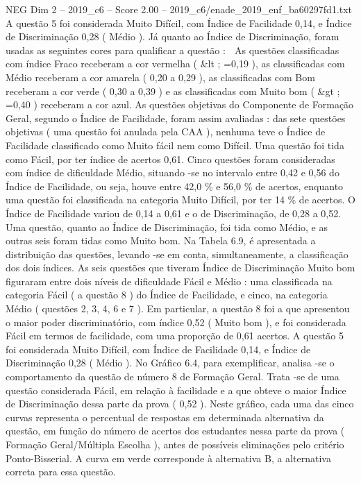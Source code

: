 \begin{textsample}{NEG Dim 2 – 2019\_c6 – Score 2.00 – 2019\_c6/enade\_2019\_enf\_ba60297fd1.txt}
A questão 5 foi considerada Muito Difícil, com Índice de Facilidade 0,14, e Índice de Discriminação 0,28 ( Médio ).
Já quanto ao Índice de Discriminação, foram usadas as seguintes cores para qualificar a questão :  As questões classificadas com índice Fraco receberam a cor vermelha ( \&lt ; =0,19 ), as classificadas com Médio receberam a cor amarela ( 0,20 a 0,29 ), as classificadas com Bom receberam a cor verde ( 0,30 a 0,39 ) e as classificadas com Muito bom ( \&gt ; =0,40 ) receberam a cor azul.
As questões objetivas do Componente de Formação Geral, segundo o Índice de Facilidade, foram assim avaliadas : das sete questões objetivas ( uma questão foi anulada pela CAA ), nenhuma teve o Índice de Facilidade classificado como Muito fácil nem como Difícil.
Uma questão foi tida como Fácil, por ter índice de acertos 0,61.
Cinco questões foram consideradas com índice de dificuldade Médio, situando -se no intervalo entre 0,42 e 0,56 do Índice de Facilidade, ou seja, houve entre 42,0 \% e 56,0 \% de acertos, enquanto uma questão foi classificada na categoria Muito Difícil, por ter 14 \% de acertos.
O Índice de Facilidade variou de 0,14 a 0,61 e o de Discriminação, de 0,28 a 0,52.
Uma questão, quanto ao Índice de Discriminação, foi tida como Médio, e as outras seis foram tidas como Muito bom.
Na Tabela 6.9, é apresentada a distribuição das questões, levando -se em conta, simultaneamente, a classificação dos dois índices.
As seis questões que tiveram Índice de Discriminação Muito bom figuraram entre dois níveis de dificuldade Fácil e Médio : uma classificada na categoria Fácil ( a questão 8 ) do Índice de Facilidade, e cinco, na categoria Médio ( questões 2, 3, 4, 6 e 7 ).
Em particular, a questão 8 foi a que apresentou o maior poder discriminatório, com índice 0,52 ( Muito bom ), e foi considerada Fácil em termos de facilidade, com uma proporção de 0,61 acertos.
A questão 5 foi considerada Muito Difícil, com Índice de Facilidade 0,14, e Índice de Discriminação 0,28 ( Médio ).
No Gráfico 6.4, para exemplificar, analisa -se o comportamento da questão de número 8 de Formação Geral.
Trata -se de uma questão considerada Fácil, em relação à facilidade e a que obteve o maior Índice de Discriminação dessa parte da prova ( 0,52 ).
Neste gráfico, cada uma das cinco curvas representa o percentual de respostas em determinada alternativa da questão, em função do número de acertos dos estudantes nessa parte da prova ( Formação Geral/Múltipla Escolha ), antes de possíveis eliminações pelo critério Ponto-Bisserial.
A curva em verde corresponde à alternativa B, a alternativa correta para essa questão.

\end{textsample}
